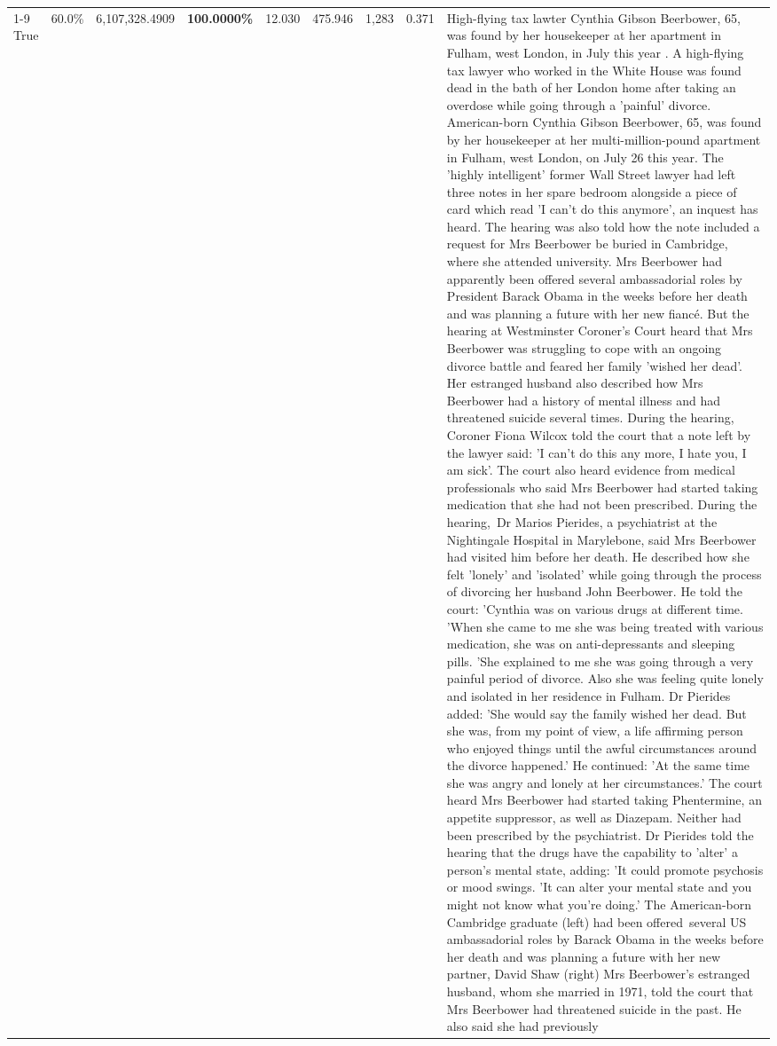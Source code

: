 \begin{table}[H]
\begin{tabular}{lllrlllll}
\cline{1-9}
True & 60.0\% & 6,107,328.4909 & \bfseries \color{red} 100.0000\% & 12.030 & 475.946 & 1,283 & 0.371 & High-flying tax lawter Cynthia Gibson Beerbower, 65, was found by her housekeeper at her apartment in Fulham, west London, in July this year . A high-flying tax lawyer who worked in the White House was found dead in the bath of her London home after taking an overdose while going through a 'painful' divorce. American-born Cynthia Gibson Beerbower, 65, was found by her housekeeper at her multi-million-pound apartment in Fulham, west London, on July 26 this year. The 'highly intelligent' former Wall Street lawyer had left three notes in her spare bedroom alongside a piece of card which read 'I can't do this anymore', an inquest has heard. The hearing was also told how the note included a request for Mrs Beerbower be buried in Cambridge, where she attended university. Mrs Beerbower had apparently been offered several ambassadorial roles by President Barack Obama in the weeks before her death and was planning a future with her new fiancé. But the hearing at Westminster Coroner's Court heard that Mrs Beerbower was struggling to cope with an ongoing divorce battle and feared her family 'wished her dead'. Her estranged husband also described how Mrs Beerbower had a history of mental illness and had threatened suicide several times. During the hearing, Coroner Fiona Wilcox told the court that a note left by the lawyer said: 'I can't do this any more, I hate you, I am sick'. The court also heard evidence from medical professionals who said Mrs Beerbower had started taking medication that she had not been prescribed. During the hearing, Dr Marios Pierides, a psychiatrist at the Nightingale Hospital in Marylebone, said Mrs Beerbower had visited him before her death. He described how she felt 'lonely' and 'isolated' while going through the process of divorcing her husband John Beerbower. He told the court: 'Cynthia was on various drugs at different time. 'When she came to me she was being treated with various medication, she was on anti-depressants and sleeping pills. 'She explained to me she was going through a very painful period of divorce. Also she was feeling quite lonely and isolated in her residence in Fulham. Dr Pierides added: 'She would say the family wished her dead. But she was, from my point of view, a life affirming person who enjoyed things until the awful circumstances around the divorce happened.' He continued: 'At the same time she was angry and lonely at her circumstances.' The court heard Mrs Beerbower had started taking Phentermine, an appetite suppressor, as well as Diazepam. Neither had been prescribed by the psychiatrist. Dr Pierides told the hearing that the drugs have the capability to 'alter' a person's mental state, adding: 'It could promote psychosis or mood swings. 'It can alter your mental state and you might not know what you're doing.' The American-born Cambridge graduate (left) had been offered several US ambassadorial roles by Barack Obama in the weeks before her death and was planning a future with her new partner, David Shaw (right) Mrs Beerbower's estranged husband, whom she married in 1971, told the court that Mrs Beerbower had threatened suicide in the past. He also said she had previously 
\end{tabular}
\end{table}
